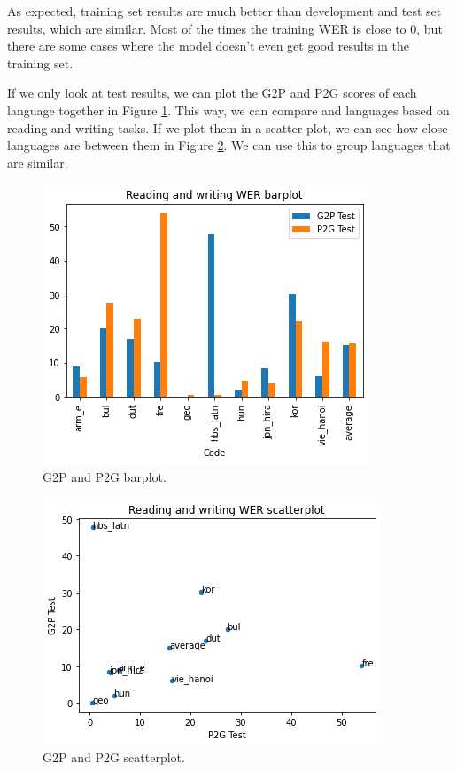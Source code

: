 \documentclass[11pt,a4paper]{article}
\begin{document}
As expected, training set results are much better than development and test set results, which are similar. Most of the times the training WER is close to 0, but there are some cases where the model doesn't even get good results in the training set.

If we only look at test results, we can plot the G2P and P2G scores of each language together in Figure \ref{fig:g2p_p2g_barplot}. This way, we can compare and languages based on reading and writing tasks. If we plot them in a scatter plot, we can see how close languages are between them in Figure \ref{fig:g2p_p2g_scatterplot}. We can use this to group languages that are similar.

\begin{figure}[ht]
    \centering
    \includegraphics[width=\linewidth]{g2p_p2g_barplot.png}
    \caption{G2P and P2G barplot.}
    \label{fig:g2p_p2g_barplot}
\end{figure}

\begin{figure}[ht]
    \centering
    \includegraphics[width=\linewidth]{g2p_p2g_scatterplot.png}
    \caption{G2P and P2G scatterplot.}
    \label{fig:g2p_p2g_scatterplot}
\end{figure}
\end{document}
